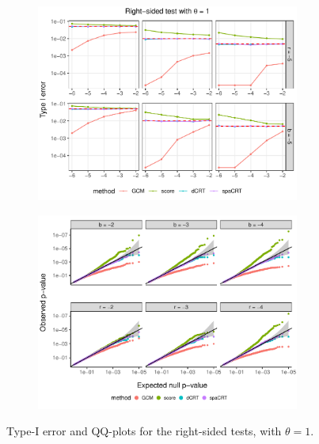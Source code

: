 \documentclass[12pt]{article}
\theoremstyle{definition}
\begin{document}
\begin{figure}
  \centering
  \begin{subfigure}{\textwidth}
    \centering
    \includegraphics[width=0.95\textwidth]{figures-and-tables/simulation/Type-I-error/plot-bin-NB-normal-B-50000-n-5000-5e3-n5-n5-disp-1-Type-I-error-RIGHT.pdf}
  \end{subfigure}

  \begin{subfigure}{\textwidth}
    \centering
    \includegraphics[width=0.95\textwidth]{figures-and-tables/simulation/QQ/plot-bin-NB-normal-B-50000-n-5000-5e3-n5-n5-disp-1-QQ-RIGHT.pdf}
  \end{subfigure}
  \caption{Type-I error and QQ-plots for the right-sided tests, with $\theta = 1$.}
  \label{fig:simulation-Type-I-error-RIGHT-1}
\end{figure}
\end{document}
